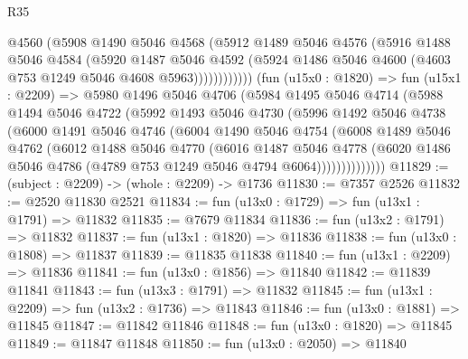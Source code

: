 \begin{lexlean}{R35}
\begin{coremodule}
                    @4560
                    (@5908
                      @1490
                      @5046
                      @4568
                      (@5912
                        @1489
                        @5046
                        @4576
                        (@5916
                          @1488
                          @5046
                          @4584
                          (@5920
                            @1487
                            @5046
                            @4592
                            (@5924 @1486 @5046 @4600 (@4603 @753 @1249 @5046 @4608 @5963))))))))))))
        (fun (u15x0 : @1820) =>
        fun (u15x1 : @2209) =>
        @5980
          @1496
          @5046
          @4706
          (@5984
            @1495
            @5046
            @4714
            (@5988
              @1494
              @5046
              @4722
              (@5992
                @1493
                @5046
                @4730
                (@5996
                  @1492
                  @5046
                  @4738
                  (@6000
                    @1491
                    @5046
                    @4746
                    (@6004
                      @1490
                      @5046
                      @4754
                      (@6008
                        @1489
                        @5046
                        @4762
                        (@6012
                          @1488
                          @5046
                          @4770
                          (@6016
                            @1487
                            @5046
                            @4778
                            (@6020
                              @1486
                              @5046
                              @4786
                              (@4789 @753 @1249 @5046 @4794 @6064))))))))))))))
@11829 := (subject : @2209) -> (whole : @2209) -> @1736
@11830 := @7357 @2526
@11832 := @2520 @11830 @2521
@11834 := fun (u13x0 : @1729) => fun (u13x1 : @1791) => @11832
@11835 := @7679 @11834
@11836 := fun (u13x2 : @1791) => @11832
@11837 := fun (u13x1 : @1820) => @11836
@11838 := fun (u13x0 : @1808) => @11837
@11839 := @11835 @11838
@11840 := fun (u13x1 : @2209) => @11836
@11841 := fun (u13x0 : @1856) => @11840
@11842 := @11839 @11841
@11843 := fun (u13x3 : @1791) => @11832
@11845 := fun (u13x1 : @2209) => fun (u13x2 : @1736) => @11843
@11846 := fun (u13x0 : @1881) => @11845
@11847 := @11842 @11846
@11848 := fun (u13x0 : @1820) => @11845
@11849 := @11847 @11848
@11850 := fun (u13x0 : @2050) => @11840

\end{coremodule}
\end{lexlean}
